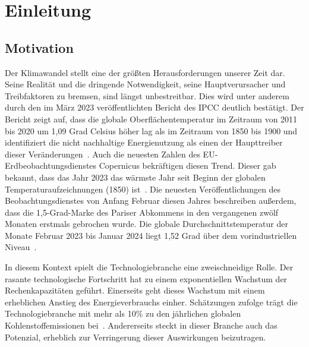 \chapter{Einleitung}

\section{Motivation}
Der Klimawandel stellt eine der größten Herausforderungen unserer Zeit dar.
Seine Realität und die dringende Notwendigkeit, seine Hauptverursacher und Treibfaktoren zu bremsen, sind längst unbestreitbar.
Dies wird unter anderem durch den im März 2023 veröffentlichten Bericht des \ac{IPCC} deutlich bestätigt.
Der Bericht zeigt auf, dass die globale Oberflächentemperatur im Zeitraum von 2011 bis 2020 um 1,09 Grad Celsius höher lag als im Zeitraum von 1850 bis 1900 und identifiziert die nicht nachhaltige Energienutzung als einen der Haupttreiber dieser Veränderungen~\cite{IPCC.2023}.
Auch die neuesten Zahlen des EU-Erdbeobachtungsdienstes Copernicus bekräftigen diesen Trend.
Dieser gab bekannt, dass das Jahr 2023 das wärmste Jahr seit Beginn der globalen Temperaturaufzeichnungen (1850) ist~\cite{CopernicusClimateChangeService.09.01.2024}.
Die neuesten Veröffentlichungen des Beobachtungsdienstes von Anfang Februar diesen Jahres beschreiben außerdem, dass die 1,5-Grad-Marke des Pariser Abkommens in den vergangenen zwölf Monaten erstmals gebrochen wurde.
Die globale Durchschnittstemperatur der Monate Februar 2023 bis Januar 2024 liegt 1,52 Grad über dem vorindustriellen Niveau~\cite{Eichhorn.8.2.2024}.

In diesem Kontext spielt die Technologiebranche eine zweischneidige Rolle.
Der rasante technologische Fortschritt hat zu einem exponentiellen Wachstum der Rechenkapazitäten geführt.
Einerseits geht dieses Wachstum mit einem erheblichen Anstieg des Energieverbrauchs einher.
Schätzungen zufolge trägt die Technologiebranche mit mehr als 10\% zu den jährlichen globalen Kohlenstoffemissionen bei~\cite{Buchanan.2023}.
Andererseits steckt in dieser Branche auch das Potenzial, erheblich zur Verringerung dieser Auswirkungen beizutragen.

